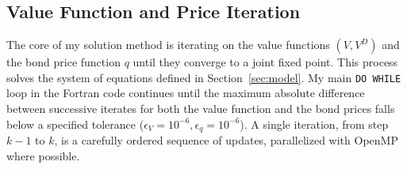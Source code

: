 \documentclass[12pt]{article}
\theoremstyle{plain}
\begin{document}
\subsection{Value Function and Price Iteration}
The core of my solution method is iterating on the value functions $(V, V^D)$
and the bond price function $q$ until they converge to a joint fixed point.
This process solves the system of equations defined in Section~\ref{sec:model}.
My main \texttt{DO WHILE} loop in the Fortran code continues until the maximum
absolute difference between successive iterates for both the value function and
the bond prices falls below a specified tolerance ($\epsilon_V = 10^{-6},
	\epsilon_q = 10^{-6}$). A single iteration, from step $k-1$ to $k$, is a
carefully ordered sequence of updates, parallelized with OpenMP where possible.
\end{document}
